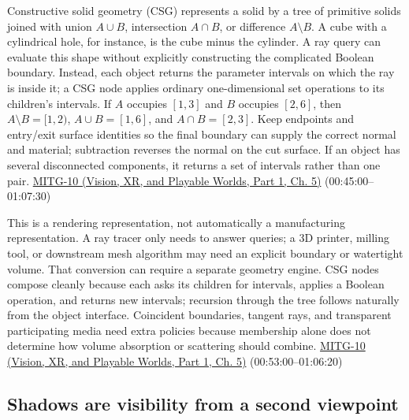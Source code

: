 \hypertarget{04-visual-computing-ii-ch028-boolean-solids-can-be-intersected-without-building-their-boundary-mesh}{}

Constructive solid geometry (CSG) represents a solid by a tree of primitive solids joined with union \(A\cup B\), intersection \(A\cap B\), or difference \(A\setminus B\). A cube with a cylindrical hole, for instance, is the cube minus the cylinder. A ray query can evaluate this shape without explicitly constructing the complicated Boolean boundary. Instead, each object returns the parameter intervals on which the ray is inside it; a CSG node applies ordinary one-dimensional set operations to its children's intervals. If \(A\) occupies \([1,3]\) and \(B\) occupies \([2,6]\), then \(A\setminus B=[1,2)\), \(A\cup B=[1,6]\), and \(A\cap B=[2,3]\). Keep endpoints and entry/exit surface identities so the final boundary can supply the correct normal and material; subtraction reverses the normal on the cut surface. If an object has several disconnected components, it returns a set of intervals rather than one pair. \href{../07-Vision-XR-and-Playable-Worlds-P01/main.pdf\#nameddest=04-visual-computing-ii-ch036-mitg-10---ray-casting-ii}{MITG-10 (Vision, XR, and Playable Worlds, Part 1, Ch. 5)} (00:45:00--01:07:30)

This is a rendering representation, not automatically a manufacturing representation. A ray tracer only needs to answer queries; a 3D printer, milling tool, or downstream mesh algorithm may need an explicit boundary or watertight volume. That conversion can require a separate geometry engine. CSG nodes compose cleanly because each asks its children for intervals, applies a Boolean operation, and returns new intervals; recursion through the tree follows naturally from the object interface. Coincident boundaries, tangent rays, and transparent participating media need extra policies because membership alone does not determine how volume absorption or scattering should combine. \href{../07-Vision-XR-and-Playable-Worlds-P01/main.pdf\#nameddest=04-visual-computing-ii-ch036-mitg-10---ray-casting-ii}{MITG-10 (Vision, XR, and Playable Worlds, Part 1, Ch. 5)} (00:53:00--01:06:20)

\subsection{Shadows are visibility from a second viewpoint}\label{04-visual-computing-ii-ch028-shadows-are-visibility-from-a-second-viewpoint}

\hypertarget{04-visual-computing-ii-ch028-shadows-are-visibility-from-a-second-viewpoint}{}


